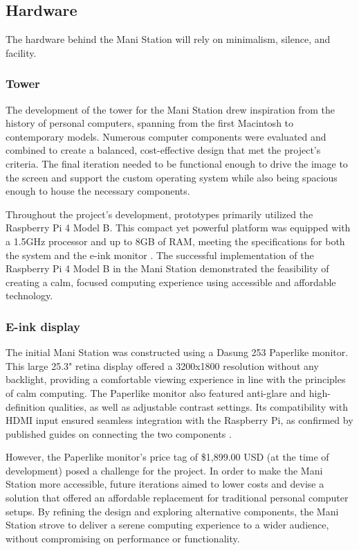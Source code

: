 \documentclass[letterpaper,twocolumn,10pt]{article}
\begin{document}
\subsection{Hardware}
The hardware behind the Mani Station will rely on minimalism, silence, and facility.
\subsubsection{Tower}
The development of the tower for the Mani Station drew inspiration from the history of personal computers, spanning from the first Macintosh to contemporary models. Numerous computer components were evaluated and combined to create a balanced, cost-effective design that met the project's criteria. The final iteration needed to be functional enough to drive the image to the screen and support the custom operating system while also being spacious enough to house the necessary components.

Throughout the project's development, prototypes primarily utilized the Raspberry Pi 4 Model B. This compact yet powerful platform was equipped with a 1.5GHz processor and up to 8GB of RAM, meeting the specifications for both the system and the e-ink monitor \cite{raspberrypi}. The successful implementation of the Raspberry Pi 4 Model B in the Mani Station demonstrated the feasibility of creating a calm, focused computing experience using accessible and affordable technology.
\subsubsection{E-ink display}
The initial Mani Station was constructed using a Dasung 253 Paperlike monitor. This large 25.3" retina display offered a 3200x1800 resolution without any backlight, providing a comfortable viewing experience in line with the principles of calm computing. The Paperlike monitor also featured anti-glare and high-definition qualities, as well as adjustable contrast settings. Its compatibility with HDMI input ensured seamless integration with the Raspberry Pi, as confirmed by published guides on connecting the two components \cite{raspberrypi}.

However, the Paperlike monitor's price tag of \$1,899.00 USD (at the time of development) posed a challenge for the project. In order to make the Mani Station more accessible, future iterations aimed to lower costs and devise a solution that offered an affordable replacement for traditional personal computer setups. By refining  the design and exploring alternative components, the Mani Station strove to deliver a serene computing experience to a wider audience, without compromising on performance or functionality.
\end{document}
